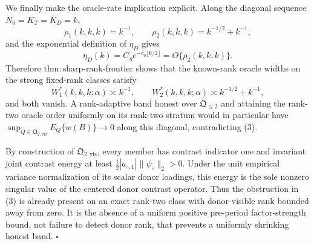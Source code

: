 We finally make the oracle-rate implication explicit.  Along the diagonal
sequence \(N_0=K_T=K_D=k\),
\[
 \rho_1(k,k,k)=k^{-1},
 \qquad
 \rho_2(k,k,k)=k^{-1/2}+k^{-1},                            \tag{7}
\]
and the exponential definition of \(\eta_D\) gives
\[
 \eta_D(k)=C_\eta e^{-c_0\lfloor k/2\rfloor}
 =O\{\rho_2(k,k,k)\}.                                     \tag{8}
\]
Therefore \(\mathrm{thm:sharp\mbox{-}rank\mbox{-}frontier}\) shows that
the known-rank oracle widths on the strong fixed-rank classes satisfy
\[
 W_1^*(k,k,k;\alpha)\asymp k^{-1},
 \qquad
 W_2^*(k,k,k;\alpha)\asymp k^{-1/2}+k^{-1},               \tag{9}
\]
and both vanish.  A rank-adaptive band honest over
\(\mathfrak Q_{\leq2}\) and attaining the rank-two oracle order uniformly
on its rank-two stratum would in particular have
\(\sup_{Q\in\mathfrak Q_{2,\mathrm{vis}}}E_Q\{w(B)\}\to0\)
along this diagonal, contradicting (3).

By construction of \(\mathfrak Q_{2,\mathrm{vis}}\), every member has
contrast indicator one and invariant joint contrast energy at least
\(\tfrac12|a_{\circ,1}|\|\psi_\circ\|_2>0\).  Under the unit empirical
variance normalization of its scalar donor loadings, this energy is the
sole nonzero singular value of the centered donor contrast operator.
Thus the obstruction in (3) is already present on an exact rank-two class
with donor-visible rank bounded away from zero.  It is the absence of a
uniform positive pre-period factor-strength bound, not failure to detect
donor rank, that prevents a uniformly shrinking honest band. \(\square\)
